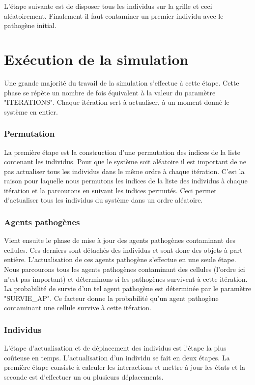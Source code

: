 L'étape suivante est de disposer tous les individus sur la grille et ceci aléatoirement. Finalement il faut contaminer un premier individu avec le pathogène initial. 

\section{Exécution de la simulation}

Une grande majorité du travail de la simulation s'effectue à cette étape. Cette phase se répète un nombre de fois équivalent à la valeur du paramètre {\small "ITERATIONS"}. Chaque itération sert à actualiser, à un moment donné le système en entier.

\subsubsection{Permutation}

La première étape est la construction d'une permutation des indices de la liste contenant les individus. Pour que le système soit aléatoire il est important de ne pas actualiser tous les individus dans le même ordre à chaque itération. C'est la raison pour laquelle nous permutons les indices de la liste des individus à chaque itération et la parcourons en suivant les indices permutés. Ceci permet d'actualiser tous les individus du système dans un ordre aléatoire.

\subsubsection{Agents pathogènes}

Vient ensuite le phase de mise à jour des agents pathogènes contaminant des cellules. Ces derniers sont détachés des individus et sont donc des objets à part entière. L'actualisation de ces agents pathogène s'effectue en une seule étape. Nous parcourons tous les agents pathogènes contaminant des cellules (l'ordre ici n'est pas important) et déterminons si les pathogènes survivent à cette itération. La probabilité de survie d'un tel agent pathogène est déterminée par le paramètre {\small "SURVIE\_AP"}. Ce facteur donne la probabilité qu'un agent pathogène contaminant une cellule survive à cette itération.

\subsubsection{Individus}

L'étape d'actualisation et de déplacement des individus est l'étape la plus coûteuse en temps. L'actualisation d'un individu se fait en deux étapes. La première étape consiste à calculer les interactions et mettre à jour les états et la seconde est d'effectuer un ou plusieurs déplacements.\\

